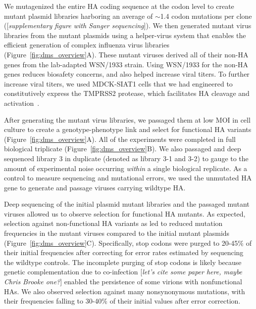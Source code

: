 \documentclass[9pt,twocolumn,twoside]{pnas-new}
\newcommand{\comment}[1]{{\color{red}[\textsl{#1}]}}
\begin{document}
We mutagenized the entire HA coding sequence at the codon level to create mutant plasmid libraries harboring an average of $\sim$1.4 codon mutations per clone (\comment{supplementary figure with Sanger sequencing}).
We then generated mutant virus libraries from the mutant plasmids using a helper-virus system that enables the efficient generation of complex influenza virus libraries~\cite{doud2016accurate} (Figure~\ref{fig:dms_overview}A).
These mutant viruses derived all of their non-HA genes from the lab-adapted WSN/1933 strain.
Using WSN/1933 for the non-HA genes reduces biosafety concerns, and also helped increase viral titers.
To further increase viral titers, we used MDCK-SIAT1 cells that we had engineered to constitutively express the TMPRSS2 protease, which facilitates HA cleavage and activation~\cite{bottcher2006proteolytic, bottcher2010cleavage}.

After generating the mutant virus libraries, we passaged them at low MOI in cell culture to create a genotype-phenotype link and select for functional HA variants (Figure~\ref{fig:dms_overview}A).
All of the experiments were completed in full biological triplicate (Figure~\ref{fig:dms_overview}B). 
We also passaged and deep sequenced library 3 in duplicate (denoted as library 3-1 and 3-2) to gauge to the amount of experimental noise occurring \textit{within} a single biological replicate.
As a control to measure sequencing and mutational errors, we used the unmutated HA gene to generate and passage viruses carrying wildtype HA.

Deep sequencing of the initial plasmid mutant libraries and the passaged mutant viruses allowed us to observe selection for functional HA mutants.
As expected, selection against non-functional HA variants as led to reduced mutation frequencies in the mutant viruses compared to the initial mutant plasmids (Figure~\ref{fig:dms_overview}C).
Specifically, stop codons were purged to 20-45\% of their initial frequencies after correcting for error rates estimated by sequencing the wildtype controls.
The incomplete purging of stop codons is likely because genetic complementation due to co-infection \comment{let's cite some paper here, maybe Chris Brooke one?} enabled the persistence of some virions with nonfunctional HAs. 
We also observed selection against many nonsynonymous mutations, with their frequencies falling to 30-40\% of their initial values after error correction.
\end{document}
